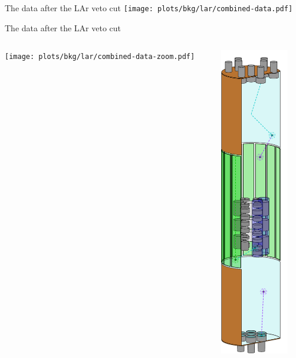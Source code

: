 \documentclass[10pt,aspectratio=169]{beamer}
\begin{document}
\begin{frame}{The data after the LAr veto cut}
  \centering
  \texttt{[image: plots/bkg/lar/combined-data.pdf]}
\end{frame}
\begin{frame}{The data after the LAr veto cut}
  \begin{columns}
    \begin{column}{0.7\textwidth}\setlength{\parskip}{10pt}%
      \centering
      \texttt{[image: plots/bkg/lar/combined-data-zoom.pdf]}
    \end{column}
    \begin{column}{0.3\textwidth}\centering
      \includegraphics[width=3cm,clip,trim=0 220 0 0]{setup/lar-veto-tikz.pdf}
    \end{column}
  \end{columns}
\end{frame}
\end{document}
